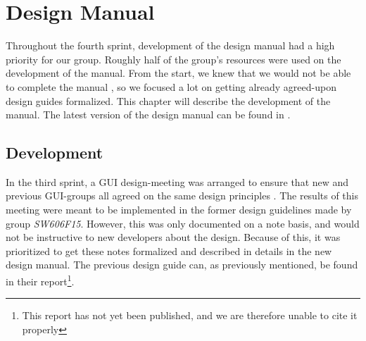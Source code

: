 
\chapter{Design Manual}
\label{cha:design_manual}

Throughout the fourth sprint, development of the design manual had a high priority for our group. Roughly half of the group's resources were used on the development of the manual. From the start, we knew that we would not be able to complete the manual , so we focused a lot on getting already agreed-upon design guides formalized. This chapter will describe the development of the manual. The latest version of the design manual can be found in .

\section{Development}
\label{sec:development}
 In the third sprint, a GUI design-meeting was arranged to ensure that new and previous GUI-groups all agreed on the same design principles .  The results of this meeting were meant to be implemented in the former design guidelines made by group \emph{SW606F15}. However, this was only documented on a note basis, and would not be instructive to new \giraf developers about the design. Because of this, it was prioritized to get these notes formalized and described in details in the new design manual. The previous design guide can, as previously mentioned, be found in their report\footnote{This report has not yet been published, and we are therefore unable to cite it properly}.


